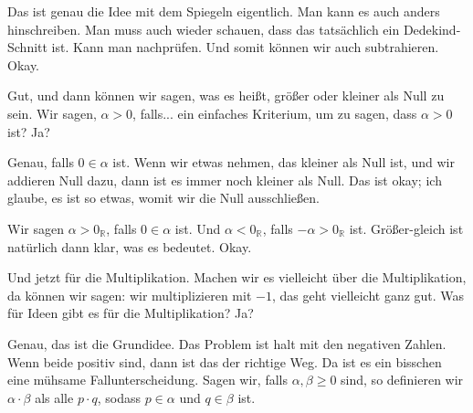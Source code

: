 \begin{spoken-clean}[01:02:20 - 01:04:45]
Das ist genau die Idee mit dem Spiegeln eigentlich. Man kann es auch anders hinschreiben. Man muss auch wieder schauen, dass das tatsächlich ein Dedekind-Schnitt ist. Kann man nachprüfen. Und somit können wir auch subtrahieren. Okay.

Gut, und dann können wir sagen, was es heißt, größer oder kleiner als Null zu sein. Wir sagen, $\alpha > 0$, falls... ein einfaches Kriterium, um zu sagen, dass $\alpha > 0$ ist? Ja?
\end{spoken-clean}

\begin{student-interaction}
Genau, falls $0 \in \alpha$ ist. Wenn wir etwas nehmen, das kleiner als Null ist, und wir addieren Null dazu, dann ist es immer noch kleiner als Null. Das ist okay; ich glaube, es ist so etwas, womit wir die Null ausschließen.
\end{student-interaction}

\begin{spoken-clean}[01:04:45 - 01:07:15]
Wir sagen $\alpha > 0_{\mathbb{R}}$, falls $0 \in \alpha$ ist. Und $\alpha < 0_{\mathbb{R}}$, falls $-\alpha > 0_{\mathbb{R}}$ ist. Größer-gleich ist natürlich dann klar, was es bedeutet. Okay.

Und jetzt für die Multiplikation. Machen wir es vielleicht über die Multiplikation, da können wir sagen: wir multiplizieren mit $-1$, das geht vielleicht ganz gut. Was für Ideen gibt es für die Multiplikation? Ja?
\end{spoken-clean}

\begin{student-interaction}
Genau, das ist die Grundidee. Das Problem ist halt mit den negativen Zahlen. Wenn beide positiv sind, dann ist das der richtige Weg. Da ist es ein bisschen eine mühsame Fallunterscheidung. Sagen wir, falls $\alpha, \beta \ge 0$ sind, so definieren wir $\alpha \cdot \beta$ als alle $p \cdot q$, sodass $p \in \alpha$ und $q \in \beta$ ist.
\end{student-interaction}

